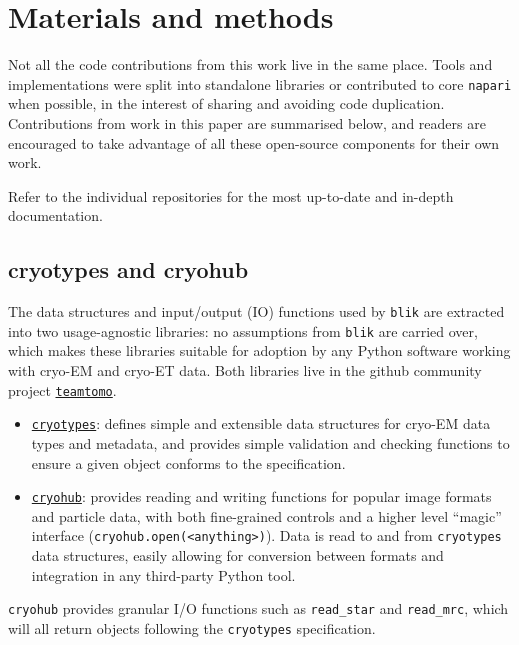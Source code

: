 \section{Materials and methods}
Not all the code contributions from this work live in the same place. Tools and implementations were split into standalone libraries or contributed to core \texttt{napari} when possible, in the interest of sharing and avoiding code duplication. Contributions from work in this paper are summarised below, and readers are encouraged to take advantage of all these open-source components for their own work.

Refer to the individual repositories for the most up-to-date and in-depth documentation.

\subsection{cryotypes and cryohub}\label{cryotypes-and-cryohub}

The data structures and input/output (IO) functions used by \texttt{blik} are extracted into two usage-agnostic libraries: no assumptions from \texttt{blik} are carried over, which makes these libraries suitable for adoption by any Python software working with cryo-EM and cryo-ET data. Both libraries live in the github community project \href{https://github.com/teamtomo/}{\texttt{teamtomo}}.

\begin{itemize}[noitemsep] 
    \item \href{https://github.com/teamtomo/cryotypes/}{\texttt{cryotypes}}: defines simple and extensible data structures for cryo-EM data types and metadata, and provides simple validation and checking functions to ensure a given object conforms to the specification. 
    \item \href{https://github.com/teamtomo/cryohub/}{\texttt{cryohub}}: provides reading and writing functions for popular image formats and particle data, with both fine-grained controls and a higher level ``magic'' interface (\texttt{cryohub.open(\textless{}anything\textgreater{})}). Data is read to and from \texttt{cryotypes} data structures, easily allowing for conversion between formats and integration in any third-party Python tool.
\end{itemize}

\texttt{cryohub} provides granular I/O functions such as \texttt{read\_star} and \texttt{read\_mrc}, which will all return objects following the \texttt{cryotypes} specification.

